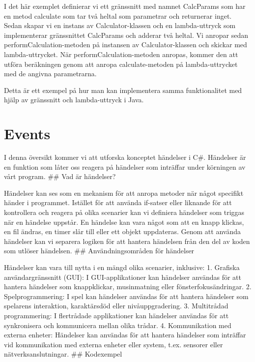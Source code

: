 I det här exemplet definierar vi ett gränssnitt med namnet CalcParams
som har en metod calculate som tar två heltal som parametrar och
returnerar inget. Sedan skapar vi en instans av Calculator-klassen och
en lambda-uttryck som implementerar gränssnittet CalcParams och adderar
två heltal. Vi anropar sedan performCalculation-metoden på instansen av
Calculator-klassen och skickar med lambda-uttrycket. När
performCalculation-metoden anropas, kommer den att utföra beräkningen
genom att anropa calculate-metoden på lambda-uttrycket med de angivna
parametrarna.

Detta är ett exempel på hur man kan implementera samma funktionalitet
med hjälp av gränssnitt och lambda-uttryck i Java.

\hypertarget{events}{%
\section{Events}\label{events}}

I denna översikt kommer vi att utforska konceptet händelser i C\#.
Händelser är en funktion som låter oss reagera på händelser som
inträffar under körningen av vårt program. \#\# Vad är händelser?

Händelser kan ses som en mekanism för att anropa metoder när något
specifikt händer i programmet. Istället för att använda if-satser eller
liknande för att kontrollera och reagera på olika scenarier kan vi
definiera händelser som triggas när en händelse uppstår. En händelse kan
vara något som att en knapp klickas, en fil ändras, en timer slår till
eller ett objekt uppdateras. Genom att använda händelser kan vi separera
logiken för att hantera händelsen från den del av koden som utlöser
händelsen. \#\# Användningsområden för händelser

Händelser kan vara till nytta i en mängd olika scenarier, inklusive: 1.
Grafiska användargränssnitt (GUI): I GUI-applikationer kan händelser
användas för att hantera händelser som knappklickar, musinmatning eller
fönsterfokusändringar. 2. Spelprogrammering: I spel kan händelser
användas för att hantera händelser som spelarens interaktion,
karaktärsdöd eller nivåuppgradering. 3. Multitrådad programmering: I
flertrådade applikationer kan händelser användas för att synkronisera
och kommunicera mellan olika trådar. 4. Kommunikation med externa
enheter: Händelser kan användas för att hantera händelser som inträffar
vid kommunikation med externa enheter eller system, t.ex. sensorer eller
nätverksanslutningar. \#\# Kodexempel

